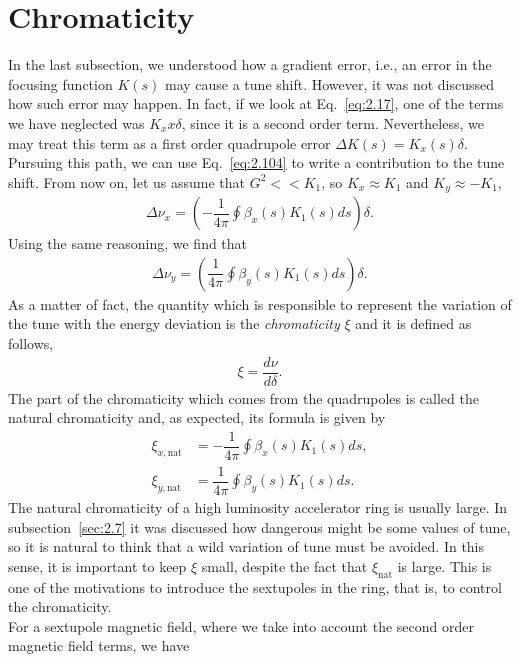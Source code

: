 \documentclass[../sands-adaptation.tex]{subfiles}
\begin{document}
\section{Chromaticity}

In the last subsection, we understood how a gradient error, i.e., an error in the focusing function $K(s)$ may cause a tune shift. However, it was not discussed how such error may happen. In fact, if we look at Eq.~\eqref{eq:2.17}, one of the terms we have neglected was $K_x x \delta$, since it is a second order term. Nevertheless, we may treat this term as a first order quadrupole error $\Delta K(s) = K_x(s) \delta$. Pursuing this path, we can use Eq.~\eqref{eq:2.104} to write a contribution to the tune shift. From now on, let us assume that ${G^2 << K_1}$, so $K_x \approx K_1$ and $K_y \approx -K_1$,
\begin{align}\label{eq:Dnux_delta}
	\Delta\nu_x = \left( -\dfrac{1}{4\pi}\oint\beta_x(s) K_1(s)ds \right) \delta.
\end{align}
Using the same reasoning, we find that
\begin{align}\label{eq:Dnuy_delta}
	\Delta\nu_y = \left( \dfrac{1}{4\pi}\oint\beta_y(s) K_1(s)ds \right) \delta.
\end{align}
As a matter of fact, the quantity which is responsible to represent the variation of the tune with the energy deviation is the \emph{chromaticity} $\xi$ and it is defined as follows,
\begin{align}
	\xi = \dfrac{d\nu}{d\delta}.	
\end{align}
The part of the chromaticity which comes from the quadrupoles is called the natural chromaticity and, as expected, its formula is given by
\begin{align}
	\xi_{x,\text{nat}} &= -\dfrac{1}{4\pi}\oint\beta_x(s) K_1(s)ds,\\
   	\xi_{y,\text{nat}} &= \dfrac{1}{4\pi}\oint\beta_y(s) K_1(s)ds.
\end{align}
The natural chromaticity of a high luminosity accelerator ring is usually large. In subsection~\ref{sec:2.7} it was discussed how dangerous might be some values of tune, so it is natural to think that a wild variation of tune must be avoided. In this sense, it is important to keep $\xi$ small, despite the fact that $\xi_\text{nat}$ is large. This is one of the motivations to introduce the sextupoles in the ring, that is, to control the chromaticity.\\
For a sextupole magnetic field, where we take into account the second order magnetic field terms, we have
\end{document}
